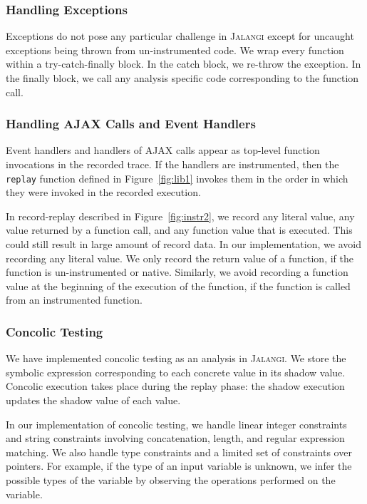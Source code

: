 \documentclass{sig-alternate}
\def\jalangi{\textsc{Jalangi}}
\begin{document}
\subsubsection*{Handling Exceptions}
\label{sec:handling-exceptions}

Exceptions do not pose any particular challenge in \jalangi{} except
for uncaught exceptions being thrown from un-instrumented code.  We
wrap every function within a try-catch-finally block.  In the catch
block, we re-throw the exception.  In the finally block, we call any
analysis specific code corresponding to the function call.

\subsubsection*{Handling AJAX Calls and Event Handlers}
\label{sec:handling-exceptions}

Event handlers and handlers of AJAX calls appear as top-level function
invocations in the recorded trace.  If the handlers are instrumented,
then the \texttt{replay} function defined in Figure~\ref{fig:lib1}
invokes them in the order in which they were invoked in the recorded
execution. 

In record-replay described in Figure~\ref{fig:instr2}, we record any
literal value, any value returned by a function call, and any function
value that is executed.  This could still result in large amount of
record data.  In our implementation, we avoid recording any literal
value.  We only record the return value of a function, if the function
is un-instrumented or native.  Similarly, we avoid recording a
function value at the beginning of the execution of the function, if
the function is called from an instrumented function.

\subsubsection*{Concolic Testing}
\label{sec:concolic-testing}

We have implemented concolic testing as an analysis in \jalangi{}.
We store the symbolic expression corresponding to each concrete value
in its shadow value.  Concolic execution takes place during the replay
phase: the shadow execution updates the shadow value of each
value.

In our implementation of concolic testing, we handle linear integer
constraints and string constraints involving concatenation, length,
and regular expression matching.  We also handle type constraints and
a limited set of constraints over pointers.  For example, if the type
of an input variable is unknown, we infer the possible types of the
variable by observing the operations performed on the variable.
\end{document}
